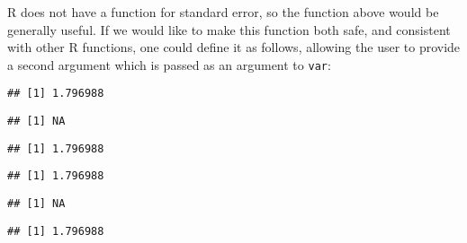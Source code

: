 \documentclass[paper=a4,headsepline,BCOR=12mm,twoside,open=right,%
titlepage,headings=small,fontsize=10pt,index=totoc,bibliography=totoc,%
captions=tableheading,captions=nooneline]{scrbook}\usepackage{knitr}
\begin{document}
R does not have a function for standard error, so the function above would be generally useful. If we would like to make this function both safe, and consistent with other R functions, one could define it as follows, allowing the user to provide a second argument which is passed as an argument to \texttt{var}:

\begin{knitrout}\footnotesize
{}\color{fgcolor}\begin{kframe}
\begin{alltt}
 \hlkwb{<-} \hlstd{(}\hlstd{,} \hlstd{=}\hlstd{)\{}
  \hlstd{(} \hlopt{/}\hlstd{(}
\hlstd{\}}
\end{alltt}
\begin{verbatim}
## [1] 1.796988
\end{verbatim}
\begin{alltt}
\end{alltt}
\begin{verbatim}
## [1] NA
\end{verbatim}
\begin{alltt}
 \hlstd{)}
\end{alltt}
\begin{verbatim}
## [1] 1.796988
\end{verbatim}
\begin{alltt}
\hlstd{(} \hlstd{=}\hlstd{)}
\end{alltt}
\begin{verbatim}
## [1] 1.796988
\end{verbatim}
\begin{alltt}
\hlstd{(}
\end{alltt}


{\ttfamily\noindent{}}\begin{verbatim}
## [1] NA
\end{verbatim}
\begin{alltt}
\hlstd{(}\hlstd{=}\hlstd{,} 
\end{alltt}
\begin{verbatim}
## [1] 1.796988
\end{verbatim}
\end{kframe}
\end{knitrout}
\end{document}
